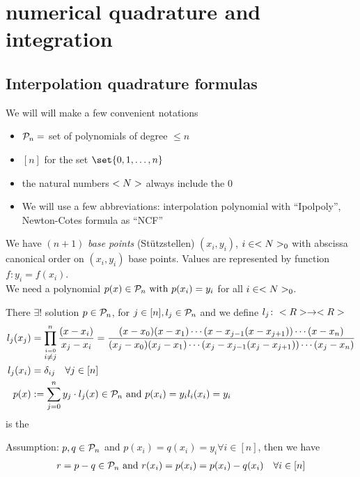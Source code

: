 \section{numerical quadrature and integration}
\subsection{Interpolation quadrature formulas}
	\begin{*notation}
		We will will make a few convenient notations
		\begin{itemize}
			\item $\mathcal{P}_n=$ set of polynomials of degree $\le n$
			\item $[n]$ for the set $\set{0,1,\dots,n}$
			\item the natural numbers $<N>$ always include the 0
			\item We will use a few abbreviations: interpolation \text polynomial with ``Ipolpoly'', Newton-Cotes formula as ``NCF'' 
		\end{itemize}
	\end{*notation}
We have $(n+1)$ \emph{base points} (Stützstellen) $(x_i,y_i)$, $i \in <N>_0$ with abscissa canonical order on $(x_i,y_i)$ base points. Values are represented by function $f\colon y_i=f(x_i)$.\\
We need a polynomial $p(x) \in \mathcal{P}_n \text{ with } p(x_i) = y_i$ for all $i \in <N>_0$.
\begin{*definition}
	There $\exists!$ solution $p \in \mathcal{P}_n$, for $j \in [n], l_j \in \mathcal{P}_n$ and we define $l_j\colon <R> \to <R>$
	\begin{align*}
	l_j(x_j) &= \prod_{\stackrel{i=0}{i\neq j}}^n \frac{(x-x_i)}{x_j-x_i} = \frac{(x-x_0)(x-x_1)\cdots(x-x_{j-1}(x-x_{j+1}))\cdots (x-x_n)}{(x_j-x_0)(x_j-x_1)\cdots(x_j-x_{j-1}(x_j-x_{j+1}))\cdots (x_j-x_n)}\\
	l_j(x_i) &= \delta_{ij} \quad \forall j \in [n]\\
	p(x) &:= \sum_{j=0}^n y_j \cdot l_j(x) \in \mathcal{P}_n \text{ and } p(x_i) = y_i l_i(x_i) = y_i
	\end{align*}
	is the 
\end{*definition}
Assumption: $p,q \in \mathcal{P}_n$ and $p(x_i) = q(x_i)= y_i \forall i \in [n]$, then we have
\begin{align*}
	r = p-q \in \mathcal{P}_n \text{ and } r(x_i) = p(x_i) = p(x_i)-q(x_i) \quad \forall i \in [n]
\end{align*}
